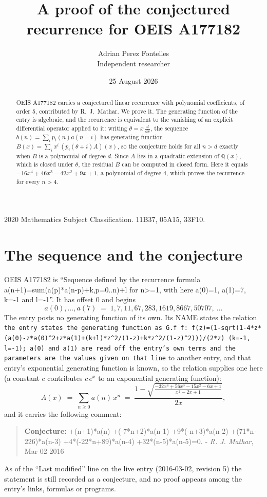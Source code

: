 \documentclass[11pt,a4paper]{article}
\title{A proof of the conjectured recurrence for OEIS A177182}
\author{Adrian Perez Fontelles\\ \small Independent researcher}
\date{25 August 2026}
\theoremstyle{plain}
\theoremstyle{definition}
\begin{document}
\maketitle

\begin{abstract}
OEIS A177182 carries a conjectured linear recurrence with polynomial coefficients, of
order 5, contributed by R.~J.~Mathar. We prove it. The generating function of the
entry is algebraic, and the recurrence is equivalent to the vanishing of an explicit
differential operator applied to it: writing $\theta=x\,\frac{d}{dx}$, the sequence
$b(n)=\sum_{i}p_{i}(n)a(n-i)$ has generating function
$B(x)=\sum_{i}x^{i}\,(p_{i}(\theta+i)A)(x)$, so the conjecture holds for all $n>d$ exactly
when $B$ is a polynomial of degree $d$. Since $A$ lies in a quadratic extension of
$\mathbb{Q}(x)$, which is closed under $\theta$, the residual $B$ can be computed in
closed form. Here it equals $- 16 x^{4} + 46 x^{3} - 42 x^{2} + 9 x + 1$, a polynomial of degree $4$, which proves
the recurrence for every $n>4$.
\end{abstract}

\noindent\small 2020 Mathematics Subject Classification. 11B37, 05A15, 33F10.\normalsize

\section{The sequence and the conjecture}

OEIS A177182 is ``Sequence defined by the recurrence formula a(n+1)=sum(a(p)*a(n-p)+k,p=0..n)+l for n>=1, with here a(0)=1, a(1)=7, k=-1 and l=-1''. It has offset $0$ and begins
\[
a(0),\dots,a(7)\;=\;1, 7, 11, 67, 283, 1619, 8667, 50707,\ \dots
\]
The entry posts no generating function of its own. Its NAME states the
relation \texttt{the entry states the generating function as G.f f: f(z)=(1-sqrt(1-4*z*(a(0)-z*a(0)\textasciicircum{}2+z*a(1)+(k+l)*z\textasciicircum{}2/(1-z)+k*z\textasciicircum{}2/(1-z)\textasciicircum{}2)))/(2*z) (k=-1, l=-1); a(0) and a(1) are read off the entry's own terms and the parameters are the values given on that line} to another entry, and that entry's exponential generating
function is known, so the relation supplies one here (a constant $c$ contributes
$c\,e^{x}$ to an exponential generating function):
\begin{equation}\label{eq:gf}
A(x)\;=\;\sum_{n\ge 0} a(n)\,x^{n}\;=\;\frac{1 - \sqrt{\frac{- 32 x^{4} + 56 x^{3} - 15 x^{2} - 6 x + 1}{x^{2} - 2 x + 1}}}{2 x} ,
\end{equation}
and it carries the following comment:
\begin{quote}\small
\textbf{Conjecture:} +(n+1)*a(n) +(-7*n+2)*a(n-1) +9*(-n+3)*a(n-2) +(71*n-226)*a(n-3) +4*(-22*n+89)*a(n-4) +32*(n-5)*a(n-5)=0. - \emph{R. J. Mathar}, Mar 02 2016
\end{quote}
As of the ``Last modified'' line on the live entry (2016-03-02, revision 5) the
statement is still recorded as a conjecture, and no proof appears among the entry's links,
formulas or programs.
\end{document}
